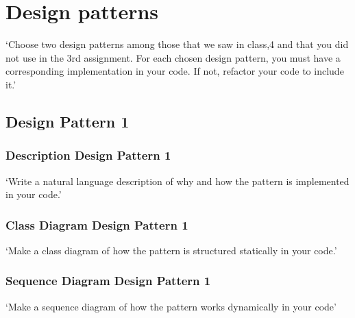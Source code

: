 \chapter{Design patterns}

`Choose two design patterns among those that we saw in class,4
and that you did not use in the 3rd assignment.
For each chosen design pattern, you must have a corresponding implementation in your code. If not,
refactor your code to include it.'

\section{Design Pattern 1}

\subsection{Description Design Pattern 1}
`Write a natural language description of why and how the pattern is implemented in your code.'

\subsection{Class Diagram Design Pattern 1}
`Make a class diagram of how the pattern is structured statically in your code.'

\subsection{Sequence Diagram Design Pattern 1}
`Make a sequence diagram of how the pattern works dynamically in your code'